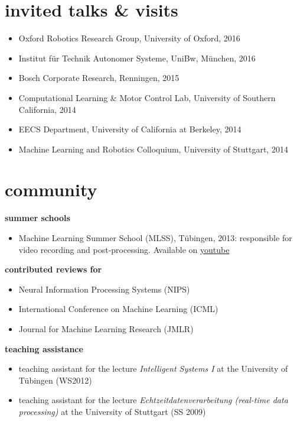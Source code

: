 \documentclass[]{k-cv} %
\begin{document}
\section{invited talks \& visits} \bodyfont
\begin{itemize}
  \item Oxford Robotics Research Group, University of Oxford, 2016
  \item Institut f{\"u}r Technik Autonomer Systeme, UniBw, M\"unchen, 2016
  \item Bosch Corporate Research, Renningen, 2015
  \item Computational Learning \& Motor Control Lab, University of Southern
California, 2014
  \item EECS Department, University of California at Berkeley, 2014
  \item Machine Learning and Robotics Colloquium, University of Stuttgart, 2014
\end{itemize}



\section{community} \bodyfont
{\Large \bfseries summer schools}
\begin{itemize}
 \item Machine Learning Summer School (MLSS), T\"ubingen, 2013: responsible for
video recording and post-processing.
Available on \href{
https://www.youtube.com/playlist?list=PLqJm7Rc5-EXFv6RXaPZzzlzo93Hl0v91E } { \to
youtube}
\end{itemize}

{\Large \bfseries contributed reviews for}
\begin{itemize}
 \item Neural Information Processing Systems (NIPS)
 \item International Conference on Machine Learning (ICML)
 \item Journal for Machine Learning Research (JMLR)
\end{itemize}

{\Large \bfseries teaching assistance}
\begin{itemize}
 \item teaching assistant for the lecture \emph{Intelligent Systems I} at the
University of T\"ubingen (WS2012)
\item teaching assistant for the lecture \emph{Echtzeitdatenverarbeitung
(real-time data processing)} at the University of Stuttgart (SS 2009)
\end{itemize}
\end{document}
